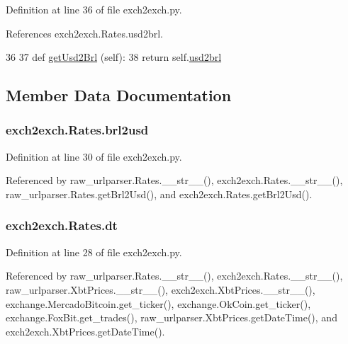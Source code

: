Definition at line 36 of file exch2exch.\-py.



References exch2exch.\-Rates.\-usd2brl.


\begin{DoxyCode}
36 
37     \textcolor{keyword}{def }\hyperlink{classexch2exch_1_1_rates_a1b3705806d2321660c4c2753474f403d}{getUsd2Brl} (self):
38         \textcolor{keywordflow}{return} self.\hyperlink{classexch2exch_1_1_rates_ab79ad6e4a42ca358e6b39c825a4b8a0b}{usd2brl}
    
\end{DoxyCode}


\subsection{Member Data Documentation}
\hypertarget{classexch2exch_1_1_rates_acc018dea09e825e18e91c73c5c63ab78}{
\subsubsection[{brl2usd}]{\setlength{\rightskip}{0pt plus 5cm}exch2exch.\-Rates.\-brl2usd}}\label{classexch2exch_1_1_rates_acc018dea09e825e18e91c73c5c63ab78}


Definition at line 30 of file exch2exch.\-py.



Referenced by raw\-\_\-urlparser.\-Rates.\-\_\-\-\_\-str\-\_\-\-\_\-(), exch2exch.\-Rates.\-\_\-\-\_\-str\-\_\-\-\_\-(), raw\-\_\-urlparser.\-Rates.\-get\-Brl2\-Usd(), and exch2exch.\-Rates.\-get\-Brl2\-Usd().

\hypertarget{classexch2exch_1_1_rates_acb12f83bce4393714ec30351a1d636c2}{
\subsubsection[{dt}]{\setlength{\rightskip}{0pt plus 5cm}exch2exch.\-Rates.\-dt}}\label{classexch2exch_1_1_rates_acb12f83bce4393714ec30351a1d636c2}


Definition at line 28 of file exch2exch.\-py.



Referenced by raw\-\_\-urlparser.\-Rates.\-\_\-\-\_\-str\-\_\-\-\_\-(), exch2exch.\-Rates.\-\_\-\-\_\-str\-\_\-\-\_\-(), raw\-\_\-urlparser.\-Xbt\-Prices.\-\_\-\-\_\-str\-\_\-\-\_\-(), exch2exch.\-Xbt\-Prices.\-\_\-\-\_\-str\-\_\-\-\_\-(), exchange.\-Mercado\-Bitcoin.\-get\-\_\-ticker(), exchange.\-Ok\-Coin.\-get\-\_\-ticker(), exchange.\-Fox\-Bit.\-get\-\_\-trades(), raw\-\_\-urlparser.\-Xbt\-Prices.\-get\-Date\-Time(), and exch2exch.\-Xbt\-Prices.\-get\-Date\-Time().

